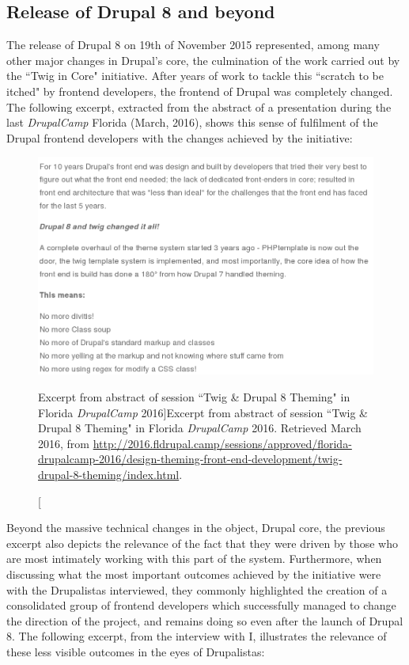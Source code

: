 \subsection{Release of Drupal 8 and beyond}

The release of Drupal 8 on 19th of November 2015 \parencite{d8-release:Online} represented, among many other major changes in Drupal's core, the culmination of the work carried out by the ``Twig in Core" initiative. After years of work to tackle this  ``scratch to be itched" by frontend developers, the frontend of Drupal was completely changed. The following excerpt, extracted from the abstract of a presentation during the last \textit{DrupalCamp} Florida (March, 2016), shows this sense of fulfilment of the Drupal frontend developers with the changes achieved by the initiative:

\begin{figure}[H]
\centering
\includegraphics[width=\textwidth]{img/quotes_replacement/dcamp_session_twig.png}
\caption[Excerpt from abstract of session ``Twig \& Drupal 8 Theming" in Florida \textit{DrupalCamp} 2016]{Excerpt from abstract of session ``Twig \& Drupal 8 Theming" in Florida \textit{DrupalCamp} 2016. Retrieved  March 2016, from \url{http://2016.fldrupal.camp/sessions/approved/florida-drupalcamp-2016/design-theming-front-end-development/twig-drupal-8-theming/index.html}.}
\label{dcamp_session_twig}
\end{figure}

Beyond the massive technical changes in the object, Drupal core, the previous excerpt also depicts the relevance of the fact that they were driven by those who are most intimately working with this part of the system. Furthermore, when discussing what the most important outcomes achieved by the initiative were with the Drupalistas interviewed, they commonly highlighted the creation of a consolidated group of frontend developers which successfully managed to change the direction of the project, and remains doing so even after the launch of Drupal 8. The following excerpt, from the interview with I, illustrates the relevance of these less visible outcomes in the eyes of Drupalistas:


